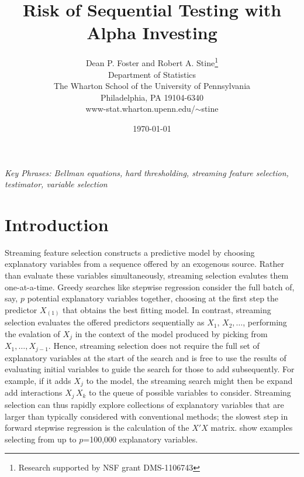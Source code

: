\documentclass[12pt]{article}
\title{ Risk of Sequential Testing with Alpha Investing }
\author{
        Dean P. Foster and Robert A. Stine\thanks{Research supported by NSF grant DMS-1106743 }  \\
        Department of Statistics            \\
        The Wharton School of the University of Pennsylvania \\
        Philadelphia, PA 19104-6340                          \\
        www-stat.wharton.upenn.edu/$\sim$stine 
}
\date{\today}
\begin{document}
\maketitle 


\vspace{0.05in}

\noindent
{\it Key Phrases: Bellman equations, hard thresholding, streaming feature
 selection, testimator, variable selection}

\clearpage


\section{ Introduction }


 Streaming feature selection constructs a predictive model by choosing
 explanatory variables from a sequence offered by an exogenous source.  Rather
 than evaluate these variables simultaneously, streaming selection evalutes them
 one-at-a-time.  Greedy searches like stepwise regression consider the full
 batch of, say, $p$ potential explanatory variables together, choosing at the
 first step the predictor $X_{(1)}$ that obtains the best fitting model.  In
 contrast, streaming selection evaluates the offered predictors sequentially as
 $X_1, \, X_2, \ldots$, performing the evalation of $X_j$ in the context of the
 model produced by picking from $X_1, \ldots, X_{j-1}$.  Hence, streaming
 selection does not require the full set of explanatory variables at the start
 of the search and is free to use the results of evaluating initial variables to
 guide the search for those to add subsequently.  For example, if it adds $X_j$
 to the model, the streaming search might then be expand add interactions $X_j
 \, X_k$ to the queue of possible variables to consider.  Streaming selection
 can thus rapidly explore collections of explanatory variables that are larger
 than typically considered with conventional methods; the slowest step in
 forward stepwise regression is the calculation of the $X'X$ matrix.
  \citet{fosterlin10} show examples selecting from up to $p$=100,000 explanatory
 variables.
\end{document}
